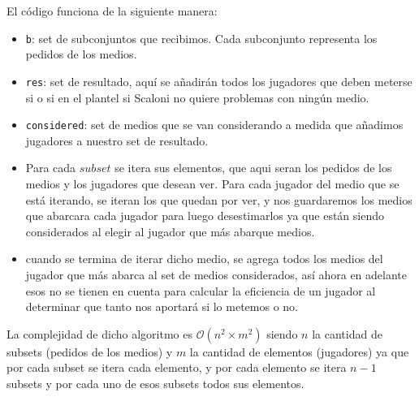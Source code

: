 El código funciona de la siguiente manera:
\begin{itemize}
    \item \texttt{b}: set de subconjuntos que recibimos. Cada subconjunto representa los pedidos de los medios.
    \item \texttt{res}: set de resultado, aquí se añadirán todos los jugadores que deben meterse si o si en el plantel si Scaloni no quiere problemas con ningún medio.
    \item \texttt{considered}: set de medios que se van considerando a medida que añadimos jugadores a nuestro set de resultado.
    \item Para cada $subset$ se itera sus elementos, que aqui seran los pedidos de los medios y los jugadores que desean ver. Para cada jugador del medio que se está iterando, se iteran los que quedan por ver, y nos guardaremos los medios que abarcara cada jugador para luego desestimarlos ya que están siendo considerados al elegir al jugador que más abarque medios.
    \item cuando se termina de iterar dicho medio, se agrega todos los medios del jugador que más abarca al set de medios considerados, así ahora en adelante esos no se tienen en cuenta para calcular la eficiencia de un jugador al determinar que tanto nos aportará si lo metemos o no.
\end{itemize}

La complejidad de dicho algoritmo es $\mathcal{O}\left(n^2 \times m^2\right)$ siendo $n$ la cantidad de subsets (pedidos de los medios) y $m$ la cantidad de elementos (jugadores) ya que por cada subset se itera cada elemento, y por cada elemento se itera $n-1$ subsets y por cada uno de esos subsets todos sus elementos.